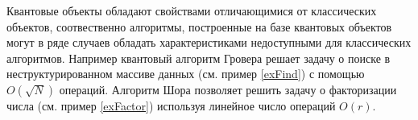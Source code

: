 Квантовые объекты обладают свойствами отличающимися от классических
объектов, соотвественно алгоритмы, построенные на базе квантовых
объектов могут в ряде случаев обладать характеристиками недоступными
для классических алгоритмов. Например квантовый алгоритм Гровера
\cite{Grover96afast} решает задачу о поиске в неструктурированном
массиве данных (см. пример \ref{exFind}) с помощью
$O\left(\sqrt{N}\right)$ операций. Алгоритм Шора \cite{bShor94}
позволяет решить задачу о факторизации числа (см. пример
\ref{exFactor}) используя линейное число операций $O\left(r\right)$. 














